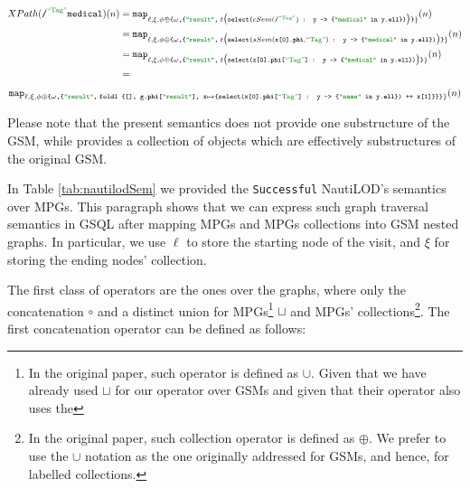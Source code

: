 \begin{example}
\hspace*{-1.5cm}\vbox{\[\begin{split}
XPath(\texttt{/}^{\mstr{Tag}}\texttt{medical})(n)&=\texttt{map}_{\ell,\xi,\phi\oplus\texttt{\{}\omega\texttt{,\{\mstr{result},}\;t\big(\texttt{select(} cSem(\texttt{/}^{\mstr{Tag}}) \texttt{ : y -> \{\mstr{medical} in y.\textbf{ell}\})}\big)\texttt{\}}\}}(n)\\
	&=\texttt{map}_{\ell,\xi,\phi\oplus\texttt{\{}\omega\texttt{,\{\mstr{result},}\;t\big(\texttt{select(} sSem(\texttt{x[0].\textbf{phi}},\mstr{Tag}) \texttt{ : y -> \{\mstr{medical} in y.\textbf{ell}\})}\big)\texttt{\}}\}}(n)\\
	&=\texttt{map}_{\ell,\xi,\phi\oplus\texttt{\{}\omega\texttt{,\{\mstr{result},}\;t\big(\texttt{select(} \texttt{x[0].\textbf{phi}[}\mstr{Tag}\texttt{]} \texttt{ : y -> \{\mstr{medical} in y.\textbf{ell}\})}\big)\texttt{\}}\}}(n)\\
	&=\\
\end{split}\]
\[\texttt{map}_{\ell,\xi,\phi\oplus\texttt{\{}\omega\texttt{,\{\mstr{result},\;foldl \{[], g.\textbf{phi}[\mstr{result}], x}\mapsto\texttt{\{}\texttt{select(} \texttt{x[0].\textbf{phi}[}\mstr{Tag}\texttt{]} \texttt{ : y -> \{\mstr{name} in y.\textbf{ell}\})}\texttt{ ++ x[1]\}\}\}}\}}(n)\]}
\end{example}

Please note that the present semantics does not provide one substructure  of the GSM, while provides a collection of objects which are effectively substructures of the original GSM.

\label{ph:NTLImpl}
In Table \vref{tab:nautilodSem} we provided the \texttt{Successful} NautiLOD's semantics over MPGs. This paragraph shows that  we can express such graph traversal semantics in GSQL after mapping MPGs and MPGs collections into GSM nested graphs. In particular, we 
use $\ell$ to store the starting node of the visit, and $\xi$ for storing the ending nodes' collection.

The first class of operators are the ones over the graphs, where only the concatenation $\circ$ and a distinct union for MPGs\footnote{In the original paper, such operator is defined as $\cup$. Given that we have already used $\sqcup$ for our operator over GSMs and given that their operator also uses the } $\sqcup$ and MPGs' collections\footnote{In the original paper, such collection operator is defined as $\oplus$. We prefer to use the $\cup$ notation as the one originally addressed for GSMs, and hence, for labelled collections.}.  The first concatenation operator can be defined as follows:

